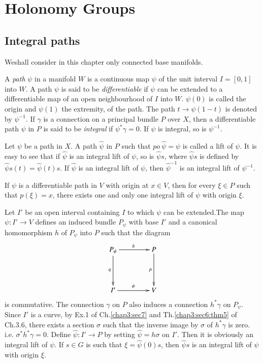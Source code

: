 \chapter{Holonomy Groups}\label{chap4}%

\section{Integral paths}\label{chap4:sec1} %

We\pageoriginale shall consider in this chapter only connected base manifolds.

\setcounter{defn}{0}
\begin{defn}\label{chap4:sec1:def1}%
  A {\em{path}} $\psi$ in a manifold $W$ is a continuous map $\psi$ of
  the unit interval $I =[0,1]$ into $W$. A path $\psi$ is said to be
  {\em{differentiable }} if $\psi$ can be extended to a differentiable
  map of an open neighbourhood of $I$ into $W$. $\psi(0)$ is called
  the origin and $\psi (1)$ the extremity, of the path. The path $t
  \rightarrow \psi(1-t)$ is denoted by $\psi^{-1}$. If $\gamma$ is a
  connection on a principal bundle $P$ over $X$, then a differentiable
  path $\psi$ in $P$ is said to be {\em{integral}} if  $\psi^* \gamma
  = 0$. If $\psi$ is integral, so is $\psi^{-1}$. 
\end{defn}

Let $\psi$ be a path in $X$. A path $\hat{\psi}$ in $P$ such that $po
~\hat{\psi} = \psi$ is called a lift of $\psi$. It is easy to see that
if $\hat{\psi}$ is an integral lift of $\psi$, so is $\hat{\psi} s$,
where $\hat{\psi} s$  is defined by  $\hat{\psi} s (t) =
\hat{\psi}(t)s$. If $\hat{\psi}$ is an integral lift of $\psi$, then
$\hat{\psi}^{-1}$ is an integral lift of $\psi^{-1}$. 

\setcounter{theorem}{0}
\begin{theorem}\label{chap4:sec1:thm1}%
  If $\psi$ is a differentiable path in $V$ with origin at $x \in V$,
  then for every $\xi \in P$  such that $p(\xi) = x$, there exists one
  and only one integral lift of $\psi$ with origin $\xi$. 
\end{theorem}

Let $I'$ be an open interval containing $I$ to which $\psi$ can be
extended.\pageoriginale The map $\psi : I' \rightarrow V$ defines an induced bundle
$P_\psi$ with base $I'$ and a canonical homomorphism $h$ of $P_\psi$
into $P$ such that the diagram 
\[
\xymatrix@R=1.5cm@C=1.5cm{P_\psi \ar[d]_q \ar[r]^h & P \ar[d]_p\\
I' \ar[r]^\psi & V}
\]
is commutative. The connection $\gamma$ on $P$ also induces a
connection $h^* \gamma$ on $P_\psi$. Since $I'$ is a curve, by Ex.1
of Ch.\ref{chap3:sec7} and Th.\ref{chap3:sec6:thm5} of Ch.3.6, there
exists a section $\sigma$ 
such that the inverse image by $\sigma$ of $h^* \gamma$ is zero. i.e. $\sigma^*
h^* \gamma = 0$. Define $\hat{\psi}: I' \rightarrow P$ by setting
$\hat{\psi} = h \sigma$ on $I'$. Then it is obviously an integral lift
of $\psi$. If $s \in G$ is such that $\xi = \hat{\psi}(0)s$, then
$\hat{\psi} s$  is an integral lift of $\psi$ with origin $\xi$. 

